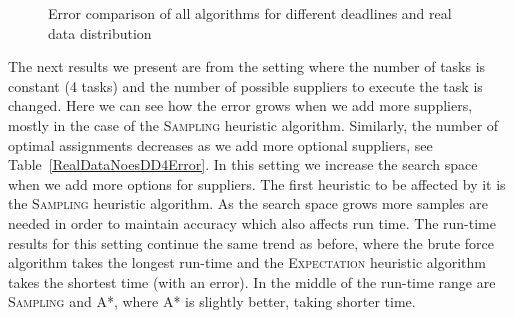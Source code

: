 \documentclass[letterpaper]{article} %
\newcommand{\astar}{\textsc{A*}\xspace}
\newcommand{\sampling}{\textsc{Sampling}\xspace}
\newcommand{\expectation}{\textsc{Expectation}\xspace}
\begin{document}
\begin{figure}[h!]
	\scriptsize
	\caption{Error comparison of all algorithms for different deadlines and real data distribution}\label{allDDRealError}
\end{figure}

The next results we present are from the setting where the number of tasks is constant (4 tasks) and the number of possible suppliers to execute the task is changed. Here we can see how the error grows when we add more suppliers, mostly in the case of the \sampling heuristic algorithm. Similarly, the number of optimal assignments decreases as we add more optional suppliers, see Table~\ref{RealDataNoesDD4Error}. In this setting we increase the search space when we add more options for suppliers. The first heuristic to be affected by it is the \sampling heuristic algorithm. As the search space grows more samples are needed in order to maintain accuracy which also affects run time.
The run-time results %
for this setting continue the same trend as before, where the brute force algorithm takes the longest run-time and the \expectation heuristic algorithm takes the shortest time (with an error). In the middle of the run-time range are \sampling and \astar, where \astar is slightly better, taking shorter time.
\end{document}
